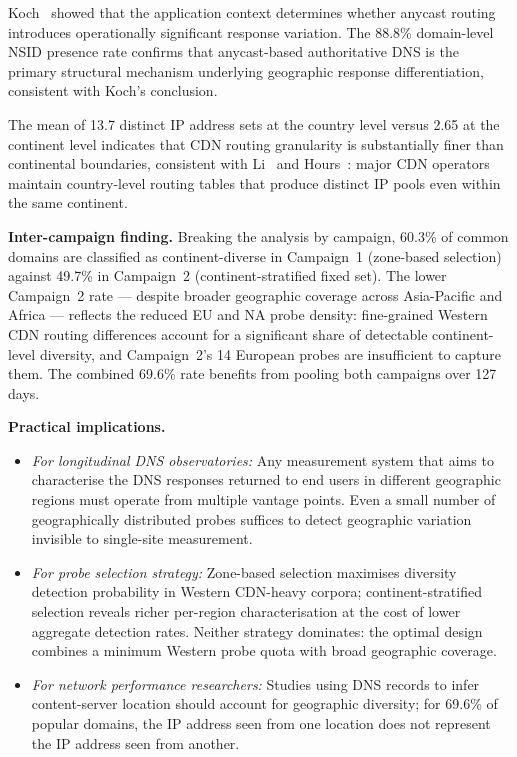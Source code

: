 Koch~\cite{Koch2021} showed that the application context determines whether anycast routing introduces operationally significant response variation. The 88.8\% domain-level \ac{NSID} presence rate confirms that anycast-based authoritative \ac{DNS} is the primary structural mechanism underlying geographic response differentiation, consistent with Koch's conclusion.

The mean of 13.7 distinct \ac{IP} address sets at the country level versus 2.65 at the continent level indicates that \ac{CDN} routing granularity is substantially finer than continental boundaries, consistent with Li~\cite{Li2025} and Hours~\cite{Hours2016}: major \ac{CDN} operators maintain country-level routing tables that produce distinct \ac{IP} pools even within the same continent.

\textbf{Inter-campaign finding.} Breaking the analysis by campaign, 60.3\% of common domains are classified as continent-diverse in Campaign~1 (zone-based selection) against 49.7\% in Campaign~2 (continent-stratified fixed set). The lower Campaign~2 rate --- despite broader geographic coverage across Asia-Pacific and Africa --- reflects the reduced EU and NA probe density: fine-grained Western \ac{CDN} routing differences account for a significant share of detectable continent-level diversity, and Campaign~2's 14 European probes are insufficient to capture them. The combined 69.6\% rate benefits from pooling both campaigns over 127 days.

\textbf{Practical implications.}
\begin{itemize}
  \item \textit{For longitudinal \ac{DNS} observatories:} Any measurement system that aims to characterise the \ac{DNS} responses returned to end users in different geographic regions must operate from multiple vantage points. Even a small number of geographically distributed probes suffices to detect geographic variation invisible to single-site measurement.
  \item \textit{For probe selection strategy:} Zone-based selection maximises diversity detection probability in Western \ac{CDN}-heavy corpora; continent-stratified selection reveals richer per-region characterisation at the cost of lower aggregate detection rates. Neither strategy dominates: the optimal design combines a minimum Western probe quota with broad geographic coverage.
  \item \textit{For network performance researchers:} Studies using \ac{DNS} records to infer content-server location should account for geographic diversity; for 69.6\% of popular domains, the \ac{IP} address seen from one location does not represent the \ac{IP} address seen from another.
\end{itemize}

